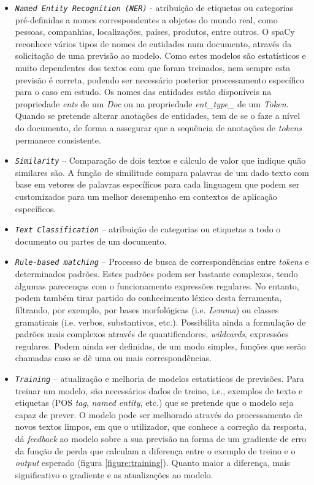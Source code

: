\documentclass[12pt]{article}
\begin{document}
\begin{itemize}
	\item \texttt{\textit{Named Entity Recognition (NER)}} - atribuição de etiquetas ou categorias pré-definidas a nomes correspondentes a objetos do mundo real, como pessoas, companhias, localizações, países, produtos, entre outros. O spaCy reconhece vários tipos de nomes de entidades num documento, através da solicitação de uma previsão ao modelo. Como estes modelos são estatísticos e muito dependentes dos textos com que foram treinados, nem sempre esta previsão é correta, podendo ser necessário posterior processamento específico para o caso em estudo. Os nomes das entidades estão disponíveis na propriedade \textit{ents} de um \textit{Doc} ou na propriedade \textit{ent\_type\_} de um \textit{Token}. Quando se pretende alterar anotações de entidades, tem de se o faze a nível do documento, de forma a assegurar que a sequência de anotações de \textit{tokens} permanece consistente.
	
	\item \texttt{\textit{Similarity}} -- Comparação de dois textos e cálculo de valor que indique quão similares são. A função de similitude compara palavras de um dado texto com base em vetores de palavras específicos para cada linguagem que podem ser customizados para um melhor desempenho em contextos de aplicação específicos.
	
	\item \texttt{\textit{Text Classification}} -- atribuição de categorias ou etiquetas a todo o documento ou partes de um documento.
	
	\item \texttt{\textit{Rule-based matching}} -- Processo de busca de correspondências entre \textit{tokens} e determinados padrões. Estes padrões podem ser bastante complexos, tendo algumas parecenças com o funcionamento expressões regulares. No entanto, podem também tirar partido do conhecimento léxico desta ferramenta, filtrando, por exemplo, por bases morfológicas (i.e. \textit{Lemma}) ou classes gramaticais (i.e. verbos, substantivos, etc.). Possibilita ainda a formulação de padrões mais complexos através de quantificadores, \textit{wildcards}, expressões regulares. Podem ainda ser definidas, de um modo simples, funções que serão chamadas caso se dê uma ou mais correspondências.
	
	\item \texttt{\textit{Training}} -- atualização e melhoria de modelos estatísticos de previsões. Para treinar um modelo, são necessários dados de treino, i.e., exemplos de texto e etiquetas (POS \textit{tag}, \textit{named entity}, etc.) que se pretende que o modelo seja capaz de prever. O modelo pode ser melhorado através do processamento de novos textos limpos, em que o utilizador, que conhece a correção da resposta, dá \textit{feedback} ao modelo sobre a sua previsão na forma de um gradiente de erro da função de perda que calculam a diferença entre o exemplo de treino e o \textit{output} esperado (figura \ref{figure:training}). Quanto maior a diferença, mais significativo o gradiente e as atualizações ao modelo.


\end{itemize}
\end{document}
